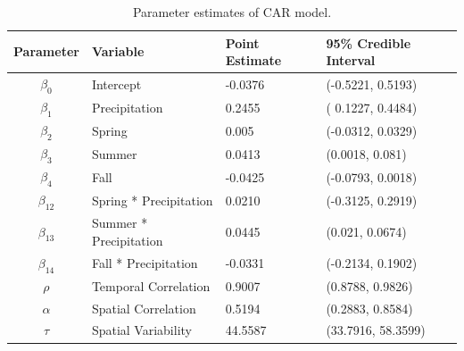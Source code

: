 \begin{table}[htbp]
\caption{Parameter estimates of CAR model.}
\centering
\begin{tabular}{|c|l|l|l|}
\hline
Parameter &  Variable &   Point Estimate & 95\%  Credible Interval\\ \hline
$ \beta_0$ & Intercept  &-0.0376  & (-0.5221,  0.5193)\\ \hline
$ \beta_1$ & Precipitation  & 0.2455 & ( 0.1227,   0.4484)\\ \hline
$ \beta_2$ & Spring  &  0.005 & (-0.0312,  0.0329) \\ \hline

$ \beta_3$ & Summer & 0.0413 & (0.0018, 0.081) \\ \hline
$ \beta_4$ & Fall  & -0.0425 & (-0.0793,  0.0018)\\ \hline

$ \beta_{12}$ & Spring * Precipitation & 0.0210  & (-0.3125,    0.2919)\\  \hline
$ \beta_{13}$ & Summer * Precipitation  & 0.0445  & (0.021,    0.0674)\\  \hline
$ \beta_{14}$ & Fall * Precipitation  & -0.0331  & (-0.2134,    0.1902)\\  \hline

$ \rho$ & Temporal Correlation &  0.9007  & (0.8788,   0.9826)\\  \hline
$ \alpha$ & Spatial Correlation  & 0.5194 &  (0.2883,   0.8584) \\ \hline
$ \tau$ & Spatial Variability &44.5587 & (33.7916,  58.3599)\\ \hline
\end{tabular}
\label{parameter estimate}
\end{table}
